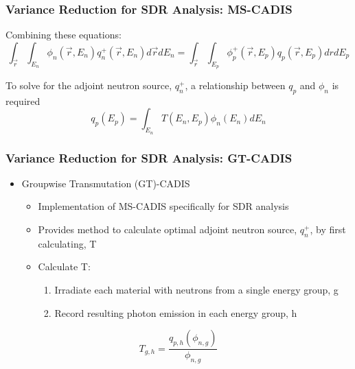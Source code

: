 \documentclass{beamer}
\begin{document}
\begin{frame}
\frametitle{Variance Reduction for SDR Analysis: MS-CADIS}
Combining these equations:
 \centering
	\begin{equation}
	\int_{\overrightarrow{r}} \int_{E_n} \phi_n(\overrightarrow{r}, E_n)
	q_n^+(\overrightarrow{r}, E_n) d\overrightarrow{r} dE_n =
	 \int_{\overrightarrow{r}} \int_{E_p} 
		\phi_p^+(\overrightarrow{r}, E_p)  q_p(\overrightarrow{r}, E_p)
		dr dE_p 
	\end{equation}

To solve for the adjoint neutron source, $q_n^+$, a relationship between $q_p$
and $\phi_n$ is required
\centering
\begin{equation}
q_p(E_p) = \int_{E_n} T(E_n, E_p) \phi_n(E_n) dE_n
\end{equation}


\end{frame}
		
\begin{frame}
\frametitle{Variance Reduction for SDR Analysis: GT-CADIS}
\begin{itemize}
\item{Groupwise Transmutation (GT)-CADIS}
  \begin{itemize}
  \item{Implementation of MS-CADIS specifically for SDR analysis}
  \item{Provides method to calculate optimal adjoint neutron source, $q_n^+$,
	  by first calculating, T}
  \item{Calculate T:}
	  \begin{enumerate}
		  \item{Irradiate each material with neutrons from a single
			  energy group, g}
		  \item{Record resulting photon emission in each energy group,
			  h}
	  \end{enumerate}
  \end{itemize}

\end{itemize}
\centering
	\begin{equation}
		T_{g,h} = \frac{q_{p,h}(\phi_{n,g})}{\phi_{n,g}}
	\end{equation}

\end{frame}
\end{document}
